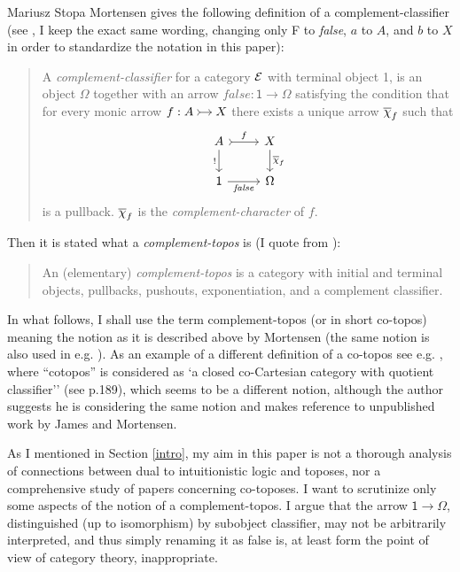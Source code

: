 \begin{artengenv}{Mariusz Stopa}
Mortensen gives the following definition of a complement-classifier (see \parencite[p.104f]{mortensen-1995}, I keep the exact same wording, changing only F to \textit{false}, $ a $ to $ A $, and $ b $ to $ X $ in order to standardize the notation in this paper):
\begin{quote}
\begin{small}
	A \textit{complement-classifier} for a category $  \mathcal{E} $ with terminal object \textsf{1}, is an object $\Omega$ together with an arrow $ \textit{false}: \textsf{1} \to \Omega $ satisfying the condition that for every monic arrow $\begin{tikzcd}[cramped, sep=small] f: A \ar[r, tail]  & X \end{tikzcd}$ there exists a unique arrow $ \overline{\chi}_f$ such that
	\begin{equation*}%
	\begin{tikzcd} 
	A \arrow[r, "f", tail] \arrow[d,"!"']    & X \arrow[d, "\ochi_f"] \\
	\textsf{1} \arrow[r, "\textit{false}"'] & \Omega
	\end{tikzcd}
	\end{equation*}
	is a pullback. $ \overline{\chi}_f $ is the \textit{complement-character} of $ f $.
\end{small}
\end{quote}


Then it is stated what a \textit{complement-topos} is (I quote from \parencite[p.105]{mortensen-1995}):
\begin{quote}
\begin{small}
	An (elementary) \textit{complement-topos} is a category with initial and terminal objects, pullbacks, pushouts, exponentiation, and a complement classifier.
\end{small}
\end{quote}

In what follows, I shall use the term complement-topos (or in short co-topos) meaning the notion as it is described above by Mortensen (the same notion is also used in e.g. \parencite{estrada-gonzalez-2010, estrada-gonzalez-2015}). As an example of a different definition of a co-topos see e.g. \parencite{angot-pellissier}, where ``cotopos'' is considered as `a closed co-Cartesian category with quotient classifier'' (see p.189), which seems to be a different notion, although the author suggests he is considering the same notion and makes reference to unpublished work by James and Mortensen.

As I mentioned in Section \ref{intro}, my aim in this paper is not a thorough analysis of connections between dual to intuitionistic logic and toposes, nor a comprehensive study of papers concerning co-toposes. I want to scrutinize only some aspects of the notion of a com\-ple\-ment-topos. I argue that the arrow $ \textsf{1} \to \Omega $, distinguished (up to isomorphism) by subobject classifier, may not be arbitrarily interpreted, and thus simply renaming it as false is, at least form the point of view of category theory, inappropriate.



\end{artengenv}

